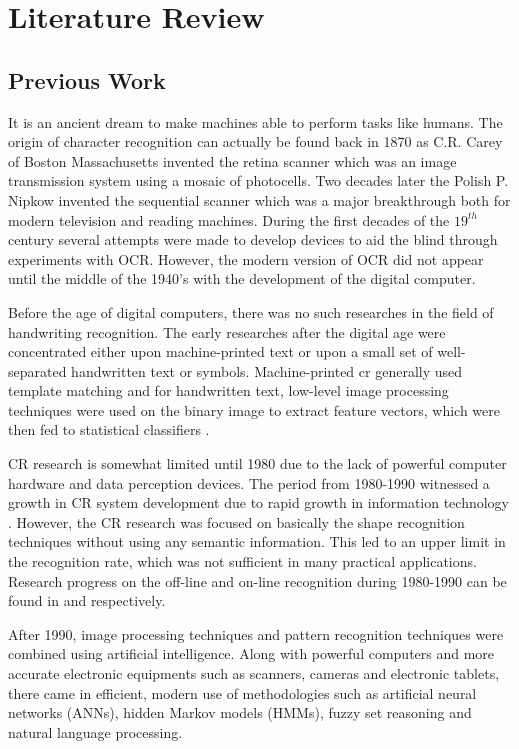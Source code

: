 \chapter{Literature Review}\label{chapter_literature_review}
\section{Previous Work}\label{section_previous_work}
It is an ancient dream to make machines able to perform tasks like humans. The origin of character recognition can actually be found back in 1870 as C.R. Carey of Boston Massachusetts invented the retina scanner which was an image transmission system using a mosaic of photocells. Two decades later the Polish P. Nipkow invented the sequential scanner which was a major breakthrough both for modern television and reading machines. During the first decades of the $19^{th}$ century several attempts were made to develop devices to aid the blind through experiments with OCR. However, the modern version of OCR did not appear until the middle of the 1940’s with the development of the digital computer.

Before the age of digital computers, there was no such researches in the field of handwriting recognition. The early researches after the digital age were concentrated either upon machine-printed text or upon a small set of well-separated handwritten text or symbols. Machine-printed \ac{cr} generally used template matching and for handwritten text, low-level image processing techniques were used on the binary image to extract feature vectors, which were then fed to statistical classifiers \cite{Suen1980}.

CR research is somewhat limited until 1980 due to the lack of powerful computer hardware and data perception devices. The period from 1980-1990 witnessed a growth in CR system development \cite{Govindan1990} due to rapid growth in information technology \cite{Bozinovic1989}. However, the CR research was focused on basically the shape recognition techniques without using any semantic information. This led to an upper limit in the recognition rate, which was not sufficient in many practical applications. Research progress on the off-line and on-line recognition during 1980-1990 can be found in \cite{Suen1992} and \cite{Suen1990} respectively.

After 1990, image processing techniques and pattern recognition techniques were combined using artificial intelligence. Along with powerful computers and more accurate electronic equipments such as scanners, cameras and electronic tablets, there came in efficient, modern use of methodologies such as artificial neural networks (ANNs), hidden Markov models (HMMs), fuzzy set reasoning and natural language processing.

